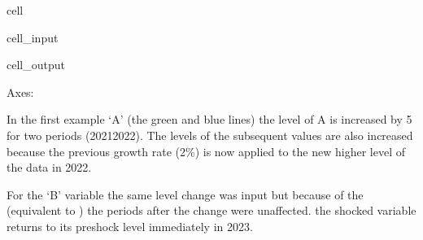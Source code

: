\documentclass[letterpaper,10pt,english]{jupyterBook}
\begin{document}
\begin{sphinxuseclass}{cell}\begin{sphinxVerbatimInput}

\begin{sphinxuseclass}{cell_input}
\begin{sphinxVerbatim}[commandchars=\\\{\}]

\PYG{p}{[}\PYG{p}{[}\PYG{p}{]}\PYG{p}{]}
    
\end{sphinxVerbatim}

\end{sphinxuseclass}\end{sphinxVerbatimInput}
\begin{sphinxVerbatimOutput}

\begin{sphinxuseclass}{cell_output}
\begin{sphinxVerbatim}[commandchars=\\\{\}]
\PYGZlt{}Axes: \PYGZgt{}
\end{sphinxVerbatim}

\noindent{}

\end{sphinxuseclass}\end{sphinxVerbatimOutput}

\end{sphinxuseclass}
\sphinxAtStartPar
In the first example ‘A’ (the green and blue lines) the level of A is increased by 5 for two periods (2021\sphinxhyphen{}2022). The levels of the subsequent values are also increased because the previous growth rate (2\%) is now applied to the new higher level of the data in 2022.

\sphinxAtStartPar
For the ‘B’ variable the same level change was input but because of the  (equivalent to ) the periods after the change were unaffected. the shocked variable returns to its pre\sphinxhyphen{}shock level immediately in 2023.
\end{document}
